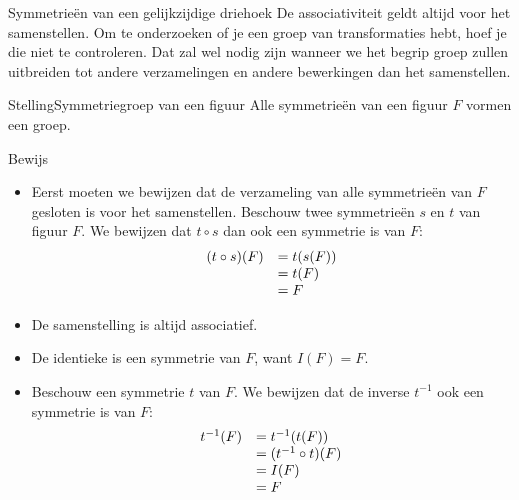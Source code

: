 \begin{lesactiviteit}{Symmetrieën van een gelijkzijdige driehoek}
	De associativiteit geldt altijd voor het samenstellen. Om te onderzoeken of je een groep van transformaties hebt, hoef je die niet te controleren. Dat zal wel nodig zijn wanneer we het begrip groep zullen uitbreiden tot andere verzamelingen en andere bewerkingen dan het samenstellen.

	\begin{vraagenantwoord}[resume]
	
	    \vspace{0.5cm}	
    \begin{kader}{Stelling}{Symmetriegroep van een figuur}
    Alle symmetrieën van een figuur $F$ vormen een groep.
    \end{kader} 
    \vspace{0.5cm}
     \begin{kader}{Bewijs}{}
    
    \begin{itemize}
        \item Eerst moeten we bewijzen dat de verzameling van alle symmetrieën van $F$ gesloten is voor het samenstellen. Beschouw twee symmetrieën $s$ en $t$ van figuur $F$. We bewijzen dat $t\circ s$ dan ook een symmetrie is van $F$:
        $$
        \begin{array}{l l } 
        (t\circ s)(F)&=t(s(F))\\
        &=t(F) \\
        &=F 
        \end{array}
        $$
    
        \item De samenstelling is altijd associatief.
          \end{itemize}
    
    \end{kader}
     \begin{kader}{}{}
    
    \begin{itemize}
        \item De identieke is een symmetrie van $F$, want $I(F)=F$.
        
        \item Beschouw een symmetrie $t$ van $F$. We bewijzen dat de inverse $t^{-1}$ ook een symmetrie is van $F$:
          $$
        \begin{array}{l l } 
        t^{-1}(F)&=t^{-1}(t(F))\\
        &=(t^{-1}\circ t)(F) \\
        &= I(F)\\
        &= F
        \end{array}
        $$
       

\end{itemize}
\end{kader}
\end{vraagenantwoord}
\end{lesactiviteit}
